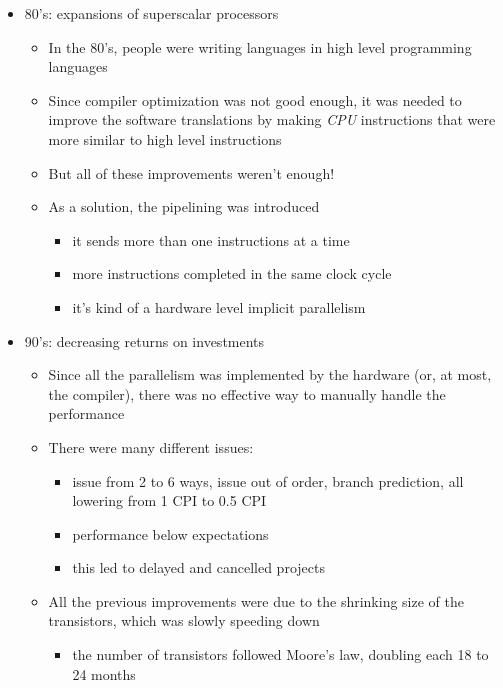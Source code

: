 \documentclass[english]{article}
\begin{document}
\begin{itemize}
  \item 80's: expansions of superscalar processors
        \begin{itemize}
          \item In the 80's, people were writing languages in high level programming languages
          \item Since compiler optimization was not good enough, it was needed to improve the software translations by making \textit{CPU} instructions that were more similar to high level instructions
          \item But all of these improvements weren't enough!
          \item As a solution, the pipelining was introduced
                \begin{itemize}
                  \item it sends more than one instructions at a time
                  \item more instructions completed in the same clock cycle
                  \item it's kind of a hardware level implicit parallelism
                \end{itemize}
        \end{itemize}
  \item 90's: decreasing returns on investments
        \begin{itemize}
          \item Since all the parallelism was implemented by the hardware (or, at most, the compiler), there was no effective way to manually handle the performance
          \item There were many different issues:
                \begin{itemize}
                  \item issue from 2 to 6 ways, issue out of order, branch prediction, all lowering from 1 CPI to 0.5 CPI
                  \item performance below expectations
                  \item this led to delayed and cancelled projects
                \end{itemize}
          \item All the previous improvements were due to the shrinking size of the transistors, which was slowly speeding down
                \begin{itemize}
                  \item[\cmark] the number of transistors followed Moore's law, doubling each 18 to 24 months

\end{itemize}
\end{itemize}
\end{itemize}
\end{document}
